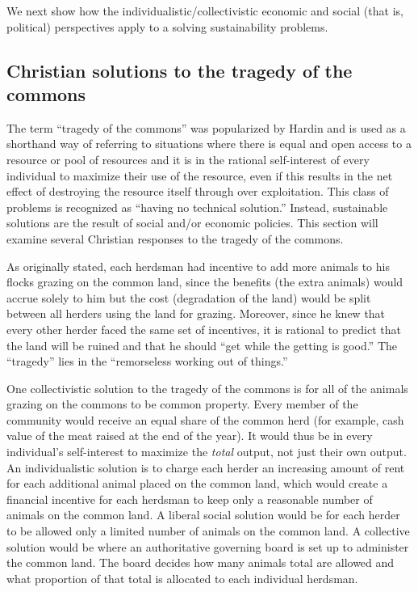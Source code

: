 \documentclass[12pt]{article}
\begin{document}
We next show how the individualistic/collectivistic economic and social (that is, political) perspectives apply to a solving sustainability problems.

\subsection{Christian solutions to the tragedy of the commons}
\label{sec:totc}
The term ``tragedy of the commons'' was popularized by Hardin \autocite{Hardin68} 
and is used as a shorthand way of referring to
situations where there is equal and open access to a resource or pool of resources and it is in the rational self-interest of
every individual to maximize their use of the resource, even if this results in the net effect of destroying the
resource itself through over exploitation. This class of problems is recognized as ``having no technical solution.''
Instead, sustainable solutions are the result of social and/or economic policies. This section will examine several
Christian responses to the tragedy of the commons.

As originally stated, each herdsman had incentive to add more animals to his flocks grazing on the common land, since
the benefits (the extra animals) would accrue solely to him but the cost (degradation of the land) would be split between
all herders using the land for grazing. Moreover, since he knew that every other herder faced the same set of
incentives, it is rational to predict that the land will be ruined and that he should ``get while the getting is good.''
The ``tragedy'' lies in the ``remorseless working out of things.''

One collectivistic solution to the tragedy of the commons is for all of the animals grazing on the commons to be common
property. Every member of the community would receive an equal share of the common herd (for example, cash value of the
meat raised at the end of the year). It would thus be in every individual's self-interest to maximize the \emph{total}
output, not just their own output. An individualistic solution is to charge each herder an increasing amount of rent for
each additional animal placed on the common land, which would create a financial incentive for each herdsman to keep
only a reasonable number of animals on the common land. A liberal social solution would be for each herder to be allowed
only a limited number of animals on the common land. A collective solution would be where an authoritative governing
board is set up to administer the common land. The board decides how many animals total are allowed and what proportion
of that total is allocated to each individual herdsman.
\end{document}
